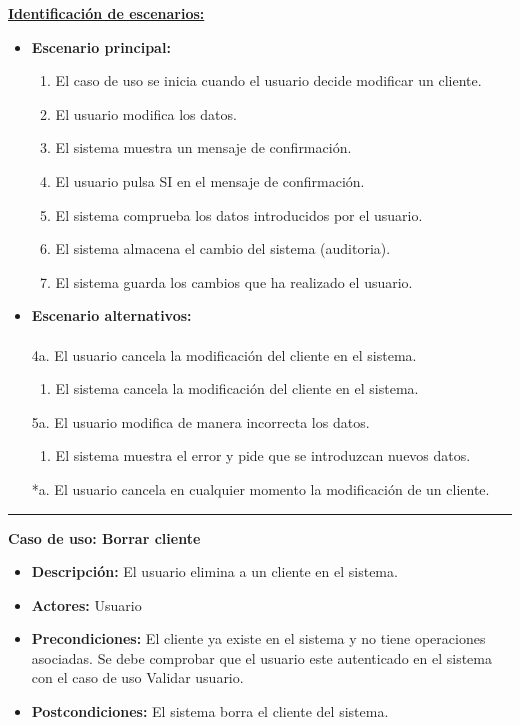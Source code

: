 \underline{\textbf{Identificación de escenarios:}}
\begin{itemize}\renewcommand{\labelitemi}{$\circ$}
 \item \textbf{Escenario principal:}
         \begin{enumerate}
          \item El caso de uso se inicia cuando el usuario decide modificar un cliente.
          \item El usuario modifica los datos.
          \item El sistema muestra un mensaje de confirmación.
          \item El usuario pulsa SI en el mensaje de confirmación.
	  \item El sistema comprueba los datos introducidos por el usuario.
 	  \item El sistema almacena el cambio del sistema (auditoria).
          \item El sistema guarda los cambios que ha realizado el usuario.
       \end{enumerate}
  \item \textbf{Escenario alternativos:}\\\\
	4a. El usuario cancela la modificación del cliente en el sistema.
	      \begin{enumerate}
	       \item El sistema cancela la modificación del cliente en el sistema.
	      \end{enumerate}
           5a. El usuario modifica de manera incorrecta los datos.
		\begin{enumerate}
		 \item El sistema muestra el error y pide que se introduzcan nuevos datos.
		\end{enumerate}
          *a. El usuario cancela en cualquier momento la modificación de un cliente.
\end{itemize}
\smallskip
\hrule height 1pt
\smallskip
\textbf{Caso de uso: Borrar cliente}
\begin{itemize}\renewcommand{\labelitemi}{$\cdot$}
 \item \textbf{Descripción:} El usuario elimina a un cliente en el sistema.
  \item \textbf{Actores:} Usuario
  \item \textbf{Precondiciones:} El cliente ya existe en el sistema y no tiene operaciones asociadas. Se debe comprobar que el usuario este autenticado en el sistema con el caso de uso Validar usuario.
  \item \textbf{Postcondiciones:} El sistema borra el cliente del sistema.
\end{itemize}

